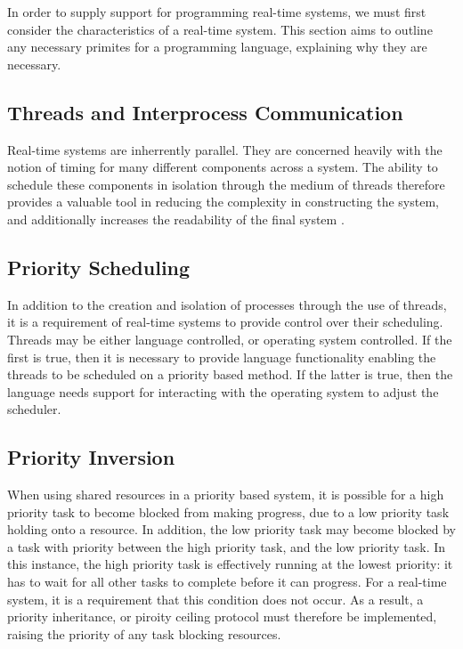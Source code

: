 In order to supply support for programming real-time systems, we must first 
consider the characteristics of a real-time system. This section aims to outline
any necessary primites for a programming language, explaining why they are 
necessary. 

\subsection{Threads and Interprocess Communication}
Real-time systems are inherrently parallel. They are concerned heavily with 
the notion of timing for many different components across a system. 
The ability to schedule these components in isolation  through the medium 
of threads therefore provides a valuable tool in reducing the complexity in 
constructing the system, and additionally increases the readability of the 
final system \cite{BURNS +WELLING p132}.

\subsection{Priority Scheduling}
In addition to the creation and isolation of processes through the use of 
threads, it is a requirement of real-time systems to provide control over 
their scheduling. Threads may be either language controlled, or operating
system controlled. If the first is true, then it is necessary to provide 
language functionality enabling the threads to be scheduled on a 
priority based method. If the latter is true, then the language needs 
support for interacting with the operating system to adjust the scheduler. 

\subsection{Priority Inversion}
When using shared resources in a priority based system, it is possible for 
a high priority task to become blocked from making progress, due to a low
priority task holding onto a resource. In addition, the low priority task 
may become blocked by a task with priority between the high priority task, 
and the low priority task. In this instance, the high priority task is 
effectively running at the lowest priority: it has to wait for all other 
tasks to complete before it can progress. 
For a real-time system, it is a requirement that this condition does not 
occur. As a result, a priority inheritance, or piroity ceiling protocol 
must therefore be implemented, raising the priority of any task blocking
resources. 

